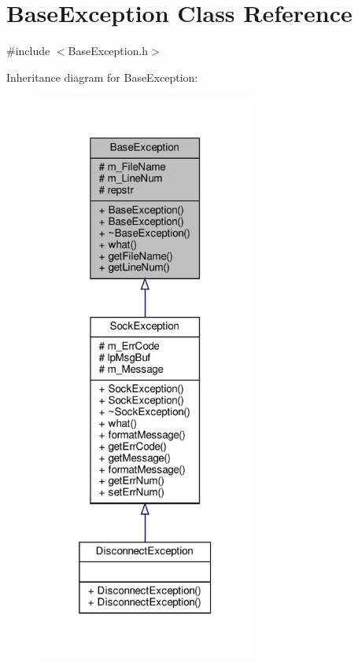\hypertarget{classBaseException}{}\section{Base\+Exception Class Reference}
\label{classBaseException}


{\ttfamily \#include $<$Base\+Exception.\+h$>$}



Inheritance diagram for Base\+Exception\+:\nopagebreak
\begin{figure}[H]
\begin{center}
\leavevmode
\includegraphics[width=205pt]{classBaseException__inherit__graph}
\end{center}
\end{figure}
